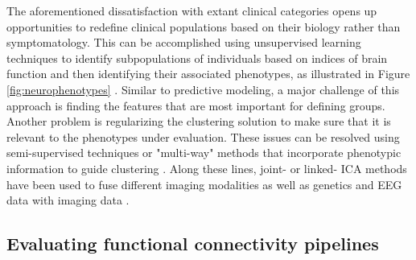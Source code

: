 \documentclass{bmcart}
\begin{document}
The aforementioned dissatisfaction with extant clinical categories opens up opportunities to redefine clinical populations based on their biology rather than symptomatology. This can be accomplished using unsupervised learning techniques to identify subpopulations of individuals based on indices of brain function and then identifying their associated phenotypes, as illustrated in Figure \ref{fig:neurophenotypes} \cite{Gates2014}. Similar to predictive modeling, a major challenge of this approach is finding the features that are most important for defining groups. Another problem is regularizing the clustering solution to make sure that it is relevant to the phenotypes under evaluation. These issues can be resolved using semi-supervised techniques or "multi-way" methods that incorporate phenotypic information to guide clustering \cite{Morup2011}. Along these lines, joint- or linked- ICA methods have been used to fuse different imaging modalities \cite{Franco2008, Groves2011} as well as genetics and EEG data with imaging data \cite{Calhoun2009}. 

\subsection{Evaluating functional connectivity pipelines}
\end{document}

